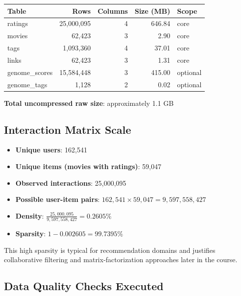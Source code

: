 \documentclass[11pt]{article}
\begin{document}
\begin{longtable}{@{}p{}r r r p{}@{}}
\toprule
\textbf{Table} & \textbf{Rows} & \textbf{Columns} & \textbf{Size (MB)} & \textbf{Scope} \\
\midrule
\endhead
ratings & 25,000,095 & 4 & 646.84 & core \\
movies & 62,423 & 3 & 2.90 & core \\
tags & 1,093,360 & 4 & 37.01 & core \\
links & 62,423 & 3 & 1.31 & core \\
genome\_scores & 15,584,448 & 3 & 415.00 & optional \\
genome\_tags & 1,128 & 2 & 0.02 & optional \\
\bottomrule
\end{longtable}

\textbf{Total uncompressed raw size}: approximately 1.1 GB

\subsection{Interaction Matrix Scale}

\begin{itemize}[leftmargin=1.5em]
    \item \textbf{Unique users}: 162,541
    \item \textbf{Unique items (movies with ratings)}: 59,047
    \item \textbf{Observed interactions}: 25,000,095
    \item \textbf{Possible user-item pairs}: $162{,}541 \times 59{,}047 = 9{,}597{,}558{,}427$
    \item \textbf{Density}: $\frac{25{,}000{,}095}{9{,}597{,}558{,}427} = 0.2605\%$
    \item \textbf{Sparsity}: $1 - 0.002605 = 99.7395\%$
\end{itemize}

This high sparsity is typical for recommendation domains and justifies collaborative filtering and matrix-factorization approaches later in the course.

\subsection{Data Quality Checks Executed}
\end{document}
